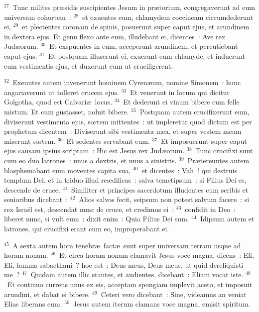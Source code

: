 ${}^{27}$~Tunc milites pr\ae sidis suscipientes Jesum in pr\ae torium, congregaverunt ad eum universam cohortem~:
${}^{28}$~et exuentes eum, chlamydem coccineam circumdederunt ei,
${}^{29}$~et plectentes coronam de spinis, posuerunt super caput ejus, et arundinem in dextera ejus. Et genu flexo ante eum, illudebant ei, dicentes~: Ave rex Jud\ae orum.
${}^{30}$~Et exspuentes in eum, acceperunt arundinem, et percutiebant caput ejus.
${}^{31}$~Et postquam illuserunt ei, exuerunt eum chlamyde, et induerunt eum vestimentis ejus, et duxerunt eum ut crucifigerent.


${}^{32}$~Exeuntes autem invenerunt hominem Cyren\ae um, nomine Simonem~: hunc angariaverunt ut tolleret crucem ejus.
${}^{33}$~Et venerunt in locum qui dicitur Golgotha, quod est Calvari\ae\ locus.
${}^{34}$~Et dederunt ei vinum bibere cum felle mistum. Et cum gustasset, noluit bibere.
${}^{35}$~Postquam autem crucifixerunt eum, diviserunt vestimenta ejus, sortem mittentes~: ut impleretur quod dictum est per prophetam dicentem~: Diviserunt sibi vestimenta mea, et super vestem meam miserunt sortem.
${}^{36}$~Et sedentes servabant eum.
${}^{37}$~Et imposuerunt super caput ejus causam ipsius scriptam~: Hic est Jesus rex Jud\ae orum.
${}^{38}$~Tunc crucifixi sunt cum eo duo latrones~: unus a dextris, et unus a sinistris.
${}^{39}$~Pr\ae tereuntes autem blasphemabant eum moventes capita sua,
${}^{40}$~et dicentes~: Vah~! qui destruis templum Dei, et in triduo illud re\ae dificas~: salva temetipsum~: si Filius Dei es, descende de cruce.
${}^{41}$~Similiter et principes sacerdotum illudentes cum scribis et senioribus dicebant~:
${}^{42}$~Alios salvos fecit, seipsum non potest salvum facere~: si rex Isra\"el est, descendat nunc de cruce, et credimus ei~:
${}^{43}$~confidit in Deo~: liberet nunc, si vult eum~: dixit enim~: Quia Filius Dei sum.
${}^{44}$~Idipsum autem et latrones, qui crucifixi erant cum eo, improperabant ei.


${}^{45}$~A sexta autem hora tenebr\ae\ fact\ae\ sunt super universam terram usque ad horam nonam.
${}^{46}$~Et circa horam nonam clamavit Jesus voce magna, dicens~: Eli, Eli, lamma sabacthani~? hoc est~: Deus meus, Deus meus, ut quid dereliquisti me~?
${}^{47}$~Quidam autem illic stantes, et audientes, dicebant~: Eliam vocat iste.
${}^{48}$~Et continuo currens unus ex eis, acceptam spongiam implevit aceto, et imposuit arundini, et dabat ei bibere.
${}^{49}$~Ceteri vero dicebant~: Sine, videamus an veniat Elias liberans eum.
${}^{50}$~Jesus autem iterum clamans voce magna, emisit spiritum.


